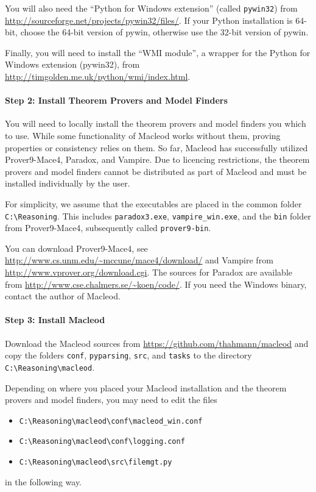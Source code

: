 \documentclass{article}
\begin{document}
You will also need the ``Python for Windows extension'' (called \texttt{pywin32}) from \url{http://sourceforge.net/projects/pywin32/files/}. If your Python installation is 64-bit, choose the 64-bit version of pywin, otherwise use the 32-bit version of pywin.

Finally, you will need to install the ``WMI module'', a wrapper for the Python for Windows extension (pywin32), from
\url{http://timgolden.me.uk/python/wmi/index.html}.


\paragraph{Step 2: Install Theorem Provers and Model Finders}

You will need to locally install the theorem provers and model finders you which to use. While some functionality of Macleod works without them, proving properties or consistency relies on them.
So far, Macleod has successfully utilized Prover9-Mace4, Paradox, and Vampire. 
Due to licencing restrictions, the theorem provers and model finders cannot be distributed as part of Macleod and must be installed individually by the user. 

For simplicity, we assume that the executables are placed in the common folder \texttt{C:\textbackslash Reasoning}. This includes \texttt{paradox3.exe}, \texttt{vampire\_win.exe}, and the \texttt{bin} folder from Prover9-Mace4, subsequently called  \texttt{prover9-bin}. 

You can download Prover9-Mace4, see \url{http://www.cs.unm.edu/~mccune/mace4/download/} and Vampire from \url{http://www.vprover.org/download.cgi}. The sources for Paradox are available from \url{http://www.cse.chalmers.se/~koen/code/}. If you need the Windows binary, contact the author of Macleod.

\paragraph{Step 3: Install Macleod}

Download the Macleod sources from \url{https://github.com/thahmann/macleod} and copy the folders \texttt{conf}, \texttt{pyparsing}, \texttt{src}, and \texttt{tasks} to the directory \texttt{C:\textbackslash Reasoning\textbackslash macleod}.

Depending on where you placed your Macleod installation and the theorem provers and model finders, you may need to edit the files
\begin{itemize}
\item \texttt{C:\textbackslash Reasoning\textbackslash macleod\textbackslash conf\textbackslash macleod\_win.conf}
\item \texttt{C:\textbackslash Reasoning\textbackslash macleod\textbackslash conf\textbackslash logging.conf}
\item \texttt{C:\textbackslash Reasoning\textbackslash macleod\textbackslash src\textbackslash filemgt.py}
\end{itemize}
in the following way. 
\end{document}
